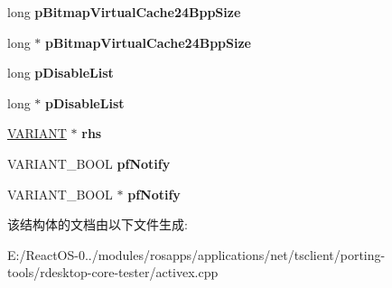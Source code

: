 \begin{DoxyCompactItemize}
long {\bfseries p\+Bitmap\+Virtual\+Cache24\+Bpp\+Size}
\item 
\mbox{\label{struct_m_s_t_s_c_lib_1_1_i_ms_rdp_client_advanced_settings_vtbl_a83a0a9799d04211d3e28d87d7539e434}} 
long $\ast$ {\bfseries p\+Bitmap\+Virtual\+Cache24\+Bpp\+Size}
\item 
\mbox{\label{struct_m_s_t_s_c_lib_1_1_i_ms_rdp_client_advanced_settings_vtbl_a08f629a6dd364c3ceb63b5309ddd8a8b}} 
long {\bfseries p\+Disable\+List}
\item 
\mbox{\label{struct_m_s_t_s_c_lib_1_1_i_ms_rdp_client_advanced_settings_vtbl_a5339370ca31165b1c6bda9f95bcd817b}} 
long $\ast$ {\bfseries p\+Disable\+List}
\item 
\mbox{\label{struct_m_s_t_s_c_lib_1_1_i_ms_rdp_client_advanced_settings_vtbl_ad4ca0f52847699dbfb09b1803e95bd83}} 
\hyperlink{structtag_v_a_r_i_a_n_t}{V\+A\+R\+I\+A\+NT} $\ast$ {\bfseries rhs}
\item 
\mbox{\label{struct_m_s_t_s_c_lib_1_1_i_ms_rdp_client_advanced_settings_vtbl_acfdc722823e829e1d6296005bc8fb207}} 
V\+A\+R\+I\+A\+N\+T\+\_\+\+B\+O\+OL {\bfseries pf\+Notify}
\item 
\mbox{\label{struct_m_s_t_s_c_lib_1_1_i_ms_rdp_client_advanced_settings_vtbl_af0edae43279bf9398f4b7c51906a0194}} 
V\+A\+R\+I\+A\+N\+T\+\_\+\+B\+O\+OL $\ast$ {\bfseries pf\+Notify}
\end{DoxyCompactItemize}


该结构体的文档由以下文件生成\+:\begin{DoxyCompactItemize}
\item 
E\+:/\+React\+O\+S-\/0../modules/rosapps/applications/net/tsclient/porting-\/tools/rdesktop-\/core-\/tester/activex.\+cpp\end{DoxyCompactItemize}
